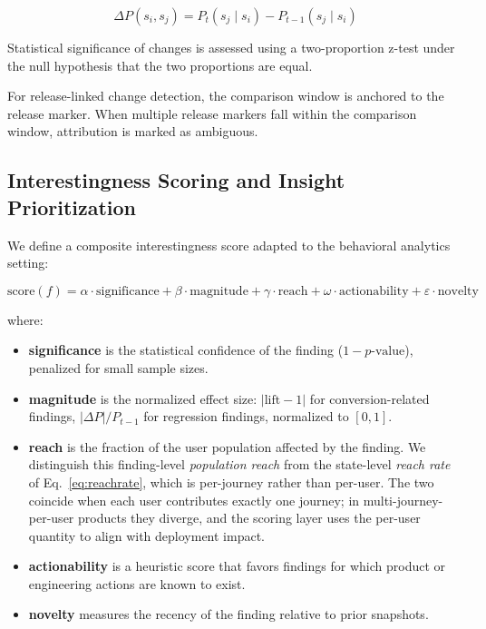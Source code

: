 \documentclass[12pt, a4paper]{article}
\begin{document}
\begin{equation}
  \Delta P(s_i, s_j) = P_t(s_j \mid s_i) - P_{t-1}(s_j \mid s_i)
  \label{eq:temporal}
\end{equation}

Statistical significance of changes is assessed using a two-proportion z-test under the null hypothesis that the two proportions are equal.

For release-linked change detection, the comparison window is anchored to the release marker. When multiple release markers fall within the comparison window, attribution is marked as ambiguous.

\subsection{Interestingness Scoring and Insight Prioritization}

We define a composite interestingness score adapted to the behavioral analytics setting:

\begin{equation}
  \text{score}(f) = \alpha \cdot \text{significance} + \beta \cdot \text{magnitude} + \gamma \cdot \text{reach} + \omega \cdot \text{actionability} + \varepsilon \cdot \text{novelty}
  \label{eq:score}
\end{equation}

where:
\begin{itemize}[leftmargin=1.5em]
  \item \textbf{significance} is the statistical confidence of the finding ($1 - p\text{-value}$), penalized for small sample sizes.
  \item \textbf{magnitude} is the normalized effect size: $|\text{lift} - 1|$ for conversion-related findings, $|\Delta P| / P_{t-1}$ for regression findings, normalized to $[0, 1]$.
  \item \textbf{reach} is the fraction of the user population affected by the finding. We distinguish this finding-level \emph{population reach} from the state-level \emph{reach rate} of Eq.~\eqref{eq:reachrate}, which is per-journey rather than per-user. The two coincide when each user contributes exactly one journey; in multi-journey-per-user products they diverge, and the scoring layer uses the per-user quantity to align with deployment impact.
  \item \textbf{actionability} is a heuristic score that favors findings for which product or engineering actions are known to exist.
  \item \textbf{novelty} measures the recency of the finding relative to prior snapshots.
\end{itemize}
\end{document}
